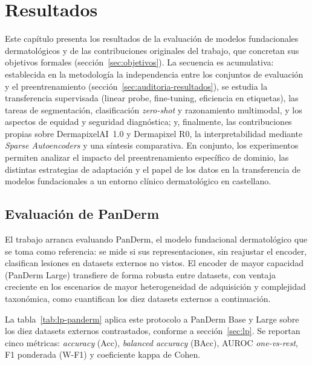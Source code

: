 
\chapter{Resultados}
\label{cap:resultados}

Este capítulo presenta los resultados de la evaluación de modelos
fundacionales dermatológicos y de las contribuciones originales del
trabajo, que concretan sus objetivos formales
(sección~\ref{sec:objetivos}). La secuencia es acumulativa: establecida en la metodología la
independencia entre los conjuntos de evaluación y el preentrenamiento
(sección~\ref{sec:auditoria-resultados}), se estudia la transferencia
supervisada (linear probe, fine-tuning, eficiencia en etiquetas), las
tareas de segmentación,
clasificación \emph{zero-shot} y razonamiento multimodal, y los
aspectos de equidad y seguridad diagnóstica; y, finalmente, las
contribuciones propias sobre DermapixelAI~1.0 y Dermapixel R0, la
interpretabilidad mediante \emph{Sparse Autoencoders} y una síntesis
comparativa. En conjunto, los experimentos permiten analizar el
impacto del preentrenamiento específico de dominio, las distintas
estrategias de adaptación y el papel de los datos en la transferencia
de modelos fundacionales a un entorno clínico dermatológico en
castellano.

\section{Evaluación de PanDerm}
\label{sec:rep-panderm}

El trabajo arranca evaluando PanDerm, el modelo fundacional
dermatológico que se toma como referencia: se mide si sus
representaciones, sin reajustar el encoder, clasifican lesiones
en datasets externos no vistos. El encoder de mayor capacidad
(PanDerm Large) transfiere de forma robusta entre datasets, con
ventaja creciente en los escenarios de mayor heterogeneidad de
adquisición y complejidad taxonómica, como cuantifican los diez
datasets externos a continuación.

La tabla~\ref{tab:lp-panderm} aplica este protocolo a PanDerm Base y
Large sobre los diez datasets externos contrastados, conforme a
sección~\ref{sec:lp}. Se reportan cinco métricas: \emph{accuracy}
(Acc), \emph{balanced accuracy} (BAcc), AUROC \emph{one-vs-rest}, F1
ponderada (W-F1) y coeficiente kappa de Cohen.

